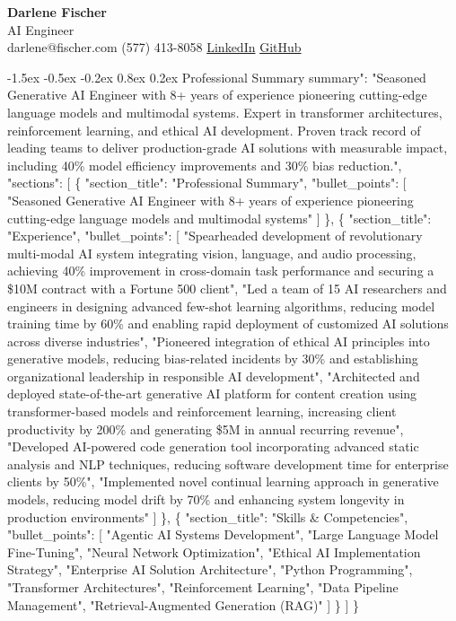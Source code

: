 \documentclass[11pt,a4paper]{article}
\makeatletter
\renewcommand{\section}{\@startsection{section}{1}{\z@}
  {-1.5ex \@plus -0.5ex \@minus -0.2ex}
  {0.8ex \@plus 0.2ex}
  {\normalfont\large\bfseries}}
\makeatother
\begin{document}
\begin{center}
{\LARGE\bfseries Darlene Fischer}\\[4pt]
{\small AI Engineer}\\[4pt]
{\small \faEnvelope{} darlene@fischer.com \quad \faPhone{} (577) 413-8058 \quad \faLinkedin{} \href{linkedin.com/in/darlene-fischer}{LinkedIn} \quad \faGithub{} \href{github.com/leetcode2307/coder}{GitHub}}
\end{center}

\section{Professional Summary}
summary": "Seasoned Generative AI Engineer with 8+ years of experience pioneering cutting-edge language models and multimodal systems. Expert in transformer architectures, reinforcement learning, and ethical AI development. Proven track record of leading teams to deliver production-grade AI solutions with measurable impact, including 40\% model efficiency improvements and 30\% bias reduction.",
  "sections": [
    \{
      "section\_title": "Professional Summary",
      "bullet\_points": [
        "Seasoned Generative AI Engineer with 8+ years of experience pioneering cutting-edge language models and multimodal systems"
      ]
    \},
    \{
      "section\_title": "Experience",
      "bullet\_points": [
        "Spearheaded development of revolutionary multi-modal AI system integrating vision, language, and audio processing, achieving 40\% improvement in cross-domain task performance and securing a \$10M contract with a Fortune 500 client",
        "Led a team of 15 AI researchers and engineers in designing advanced few-shot learning algorithms, reducing model training time by 60\% and enabling rapid deployment of customized AI solutions across diverse industries",
        "Pioneered integration of ethical AI principles into generative models, reducing bias-related incidents by 30\% and establishing organizational leadership in responsible AI development",
        "Architected and deployed state-of-the-art generative AI platform for content creation using transformer-based models and reinforcement learning, increasing client productivity by 200\% and generating \$5M in annual recurring revenue",
        "Developed AI-powered code generation tool incorporating advanced static analysis and NLP techniques, reducing software development time for enterprise clients by 50\%",
        "Implemented novel continual learning approach in generative models, reducing model drift by 70\% and enhancing system longevity in production environments"
      ]
    \},
    \{
      "section\_title": "Skills \& Competencies",
      "bullet\_points": [
        "Agentic AI Systems Development",
        "Large Language Model Fine-Tuning",
        "Neural Network Optimization",
        "Ethical AI Implementation Strategy",
        "Enterprise AI Solution Architecture",
        "Python Programming",
        "Transformer Architectures",
        "Reinforcement Learning",
        "Data Pipeline Management",
        "Retrieval-Augmented Generation (RAG)"
      ]
    \}
  ]
\}
\end{document}

